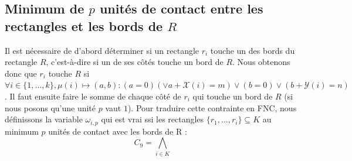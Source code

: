 \documentclass[a4paper]{article}
\begin{document}
\subsection{Minimum de $p$ unités de contact entre les rectangles et les bords de $R$}
Il est nécessaire de d'abord déterminer si un rectangle $r_i$ touche un des bords du rectangle $R$, c'est-à-dire si un de ses côtés touche un bord de $R$. Nous obtenons donc que $r_i$ touche $R$ si  $\forall i \in \{1,\dots, k\}, \mu(i) \mapsto (a,b) :  (a = 0) (\lor a+ \mathcal{X}(i) = m) \lor (b = 0) \lor (b + \mathcal{Y}(i) = n)$. Il faut ensuite faire le somme de chaque côté de $r_i$ qui touche un bord de $R$ (si nous posons qu'une unité $p$ vaut $1$). Pour traduire cette contrainte en FNC, nous définissons la variable $\omega_{i,p}$ qui est vrai ssi les rectangles $\{r_1,\dots ,r_i\} \subseteq K$ au minimum $p$ unités de contact avec les bords de R : 
\begin{equation*}
C_9 =  \bigwedge\limits_{i\in K} 
\end{equation*}
\end{document}
